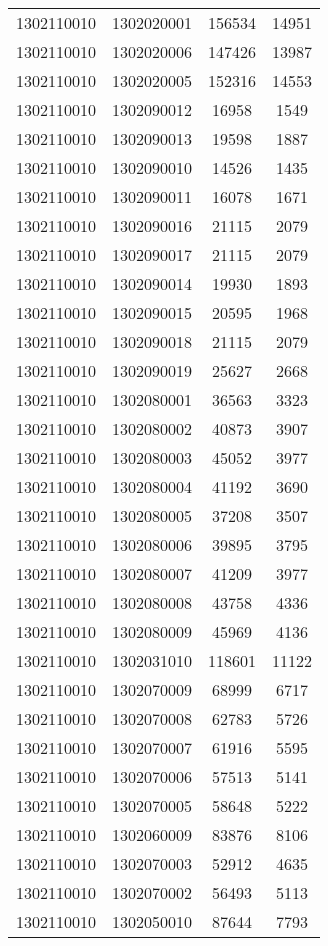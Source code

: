 \begin{longtable}{llcc}
1302110010 & 1302020001 & 156534 & 14951\\
1302110010 & 1302020006 & 147426 & 13987\\
1302110010 & 1302020005 & 152316 & 14553\\
1302110010 & 1302090012 & 16958 & 1549\\
1302110010 & 1302090013 & 19598 & 1887\\
1302110010 & 1302090010 & 14526 & 1435\\
1302110010 & 1302090011 & 16078 & 1671\\
1302110010 & 1302090016 & 21115 & 2079\\
1302110010 & 1302090017 & 21115 & 2079\\
1302110010 & 1302090014 & 19930 & 1893\\
1302110010 & 1302090015 & 20595 & 1968\\
1302110010 & 1302090018 & 21115 & 2079\\
1302110010 & 1302090019 & 25627 & 2668\\
1302110010 & 1302080001 & 36563 & 3323\\
1302110010 & 1302080002 & 40873 & 3907\\
1302110010 & 1302080003 & 45052 & 3977\\
1302110010 & 1302080004 & 41192 & 3690\\
1302110010 & 1302080005 & 37208 & 3507\\
1302110010 & 1302080006 & 39895 & 3795\\
1302110010 & 1302080007 & 41209 & 3977\\
1302110010 & 1302080008 & 43758 & 4336\\
1302110010 & 1302080009 & 45969 & 4136\\
1302110010 & 1302031010 & 118601 & 11122\\
1302110010 & 1302070009 & 68999 & 6717\\
1302110010 & 1302070008 & 62783 & 5726\\
1302110010 & 1302070007 & 61916 & 5595\\
1302110010 & 1302070006 & 57513 & 5141\\
1302110010 & 1302070005 & 58648 & 5222\\
1302110010 & 1302060009 & 83876 & 8106\\
1302110010 & 1302070003 & 52912 & 4635\\
1302110010 & 1302070002 & 56493 & 5113\\
1302110010 & 1302050010 & 87644 & 7793\\

\end{longtable}

